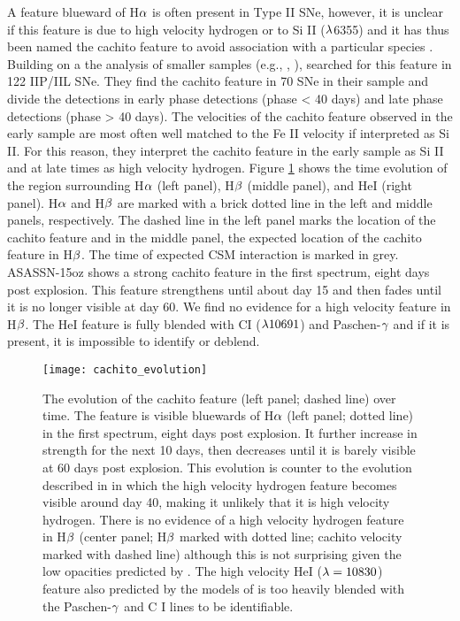 \documentclass[a4paper,fleqn,usenatbib]{mnras}
\begin{document}
A feature blueward of H$\rm{\alpha}$ is often present in Type II SNe, however, it is unclear if this feature is due to high velocity hydrogen or to Si II ($\rm{\lambda}$6355)
and it has thus been named the cachito feature to avoid association with a particular species \citep{2017gutierrez}.
Building on a the analysis of smaller samples (e.g.\citealt{2001leonard}, \citet{2013inserra}, \citealt{2014valenti}), \citet{2017gutierrez} searched for this feature in 122 IIP/IIL SNe. 
They find the cachito feature in 70 SNe in their sample and divide the detections in early phase detections (phase < 40 days) and late phase detections (phase > 40 days).
The velocities of the cachito feature observed in the early sample are most often well matched to the Fe II velocity if interpreted as Si II. 
For this reason, they interpret the cachito feature in the early sample as Si II and at late times as high velocity hydrogen.
Figure \ref{fig:CachitoEvolve} shows the time evolution of the region surrounding H$\rm{\alpha}$ (left panel), H$\rm{\beta}$ (middle panel), and HeI (right panel).
H$\rm{\alpha}$ and H$\rm{\beta}$ are marked with a brick dotted line in the left and middle panels, respectively.
The dashed line in the left panel marks the location of the cachito feature and in the middle panel, the expected location of the cachito feature in H$\rm{\beta}$.
The time of expected CSM interaction is marked in grey.
ASASSN-15oz shows a strong cachito feature in the first spectrum, eight days post explosion. 
This feature strengthens until about day 15 and then fades until it is no longer visible at day 60. 
We find no evidence for a high velocity feature in H$\rm{\beta}$.
The HeI feature is fully blended with CI ($\rm{\lambda 10691}$) and Paschen-$\rm{\gamma}$ and if it is present, it is impossible to identify or deblend.
\begin{figure}
\begin{center}
\texttt{[image: cachito\_evolution]}
\caption{The evolution of the cachito feature (left panel; dashed line) over time. 
The feature is visible bluewards of H$\rm{\alpha}$ (left panel; dotted line)  in the first spectrum, eight days post explosion.
It further increase in strength for the next 10 days, then decreases until it is barely visible at 60 days post explosion.
This evolution is counter to the evolution described in \citet{2007chugai} in which the high velocity hydrogen feature becomes visible around day 40, making it unlikely that it is high velocity hydrogen.
There is no evidence of a high velocity hydrogen feature in H$\rm{\beta}$ (center panel; H$\rm{\beta}$ marked with dotted line; cachito velocity marked with dashed line) although this is not surprising given the low opacities predicted by \citet{2007chugai}.
The high velocity HeI ($\rm{\lambda=10830}$) feature also predicted by the models of \citet{2007chugai} is too heavily blended with the Paschen-$\rm{\gamma}$ and C I lines to be identifiable.}
\label{fig:CachitoEvolve}
\end{center}
\end{figure}
\end{document}
